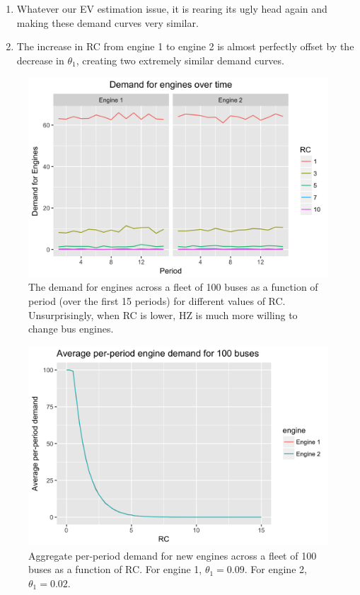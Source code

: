 \documentclass[paper=a4, fontsize=11pt]{scrartcl} %
\numberwithin{equation}{section} %
\numberwithin{figure}{section} %
\numberwithin{table}{section} %
\begin{document}
\begin{itemize}
\begin{itemize}
\begin{enumerate}
\item Whatever our EV estimation issue, it is rearing its ugly head again and making these demand curves very similar.
\item The increase in RC from engine 1 to engine 2 is almost perfectly offset by the decrease in $\theta_1$, creating two extremely similar demand curves.
\end{enumerate}

\begin{figure}[ht!]
\centering
	\includegraphics[scale=.25]{per_period_demand_plot.png}
\caption{The demand for engines across a fleet of 100 buses as a function of period (over the first 15 periods) for different values of RC. Unsurprisingly, when RC is lower, HZ is much more willing to change bus engines.}
\label{fig:time_demand_rc}
\end{figure}

\begin{figure}[ht!]
\centering
	\includegraphics[scale=.25]{aggregate_demand_plot.png}
\caption{Aggregate per-period demand for new engines across a fleet of 100 buses as a function of RC. For engine 1, $\theta_1 = 0.09$. For engine 2, $\theta_1 = 0.02$.}
\label{fig:agg_demand_rc}
\end{figure}


\end{itemize}
\end{itemize}
\end{document}
